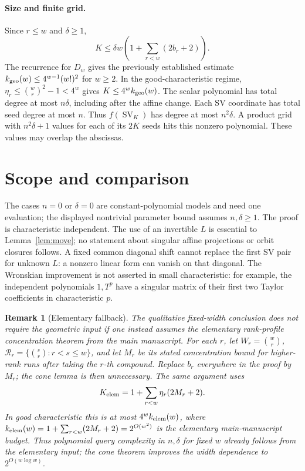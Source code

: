 \documentclass[11pt]{article}
\newtheorem{remark}[theorem]{Remark}
\newcommand{\SV}{\operatorname{SV}}
\begin{document}
\paragraph{Size and finite grid.}
Since $r\le w$ and $\delta\ge1$,
\[
 K\le\delta w\left(1+\sum_{r<w}(2b_r+2)\right).
\]
The recurrence for $D_w$ gives the previously established estimate
$k_{\rm geo}(w)\le4^{w-1}(w!)^2$ for $w\ge2$.
In the good-characteristic regime, $\eta_r\le\binom wr^2-1<4^w$
gives $K\le4^w k_{\rm geo}(w)$.
The scalar polynomial has total degree at most $n\delta$, including
after the affine change. Each SV coordinate has total seed degree
at most $n$. Thus $f(\SV_K)$ has degree at most $n^2\delta$.
A product grid with $n^2\delta+1$ values for each of its $2K$ seeds
hits this nonzero polynomial. These values may overlap the abscissas.

\section{Scope and comparison}

The cases $n=0$ or $\delta=0$ are constant-polynomial models and need
one evaluation; the displayed nontrivial parameter bound assumes
$n,\delta\ge1$. The proof is characteristic independent. The use of
an invertible $L$ is essential to Lemma~\ref{lem:move}; no statement
about singular affine projections or orbit closures follows.
A fixed common diagonal shift cannot replace the first SV pair for
unknown $L$: a nonzero linear form can vanish on that diagonal.
The Wronskian improvement is not asserted in small characteristic:
for example, the independent polynomials $1,T^p$ have a singular
matrix of their first two Taylor coefficients in characteristic $p$.

\begin{remark}[Elementary fallback]
The qualitative fixed-width conclusion does not require the geometric
input if one instead assumes the elementary rank-profile concentration
theorem from the main manuscript. For each $r$, let $W_r=\binom wr$,
$\mathcal R_r=\{\binom sr:r<s\le w\}$, and let $M_r$ be its stated
concentration bound for higher-rank runs after taking the $r$-th
compound. Replace $b_r$ everywhere in the proof by $M_r$; the cone lemma
is then unnecessary. The same argument uses
\[
 K_{\rm elem}=1+\sum_{r<w}\eta_r(2M_r+2).
\]
In good characteristic this is at most $4^w k_{\rm elem}(w)$, where
$k_{\rm elem}(w)=1+\sum_{r<w}(2M_r+2)=2^{O(w^2)}$ is the elementary
main-manuscript budget. Thus polynomial query complexity in $n,\delta$
for fixed $w$ already follows from the elementary input; the cone
theorem improves the width dependence to $2^{O(w\log w)}$.
\end{remark}
\end{document}
